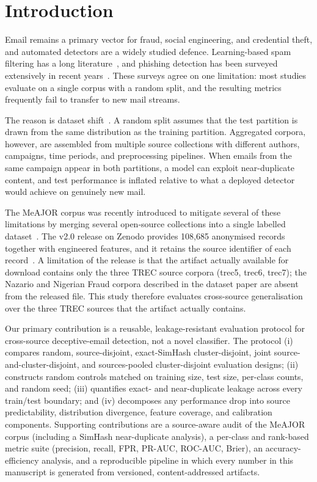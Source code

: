 \documentclass[conference]{IEEEtran}
\begin{document}
\section{Introduction}
Email remains a primary vector for fraud, social engineering, and credential theft, and automated detectors are a widely studied defence. Learning-based spam filtering has a long literature~\cite{blanzieri_bryl}, and phishing detection has been surveyed extensively in recent years~\cite{gupta_phishing}. These surveys agree on one limitation: most studies evaluate on a single corpus with a random split, and the resulting metrics frequently fail to transfer to new mail streams.

The reason is dataset shift~\cite{dataset_shift}. A random split assumes that the test partition is drawn from the same distribution as the training partition. Aggregated corpora, however, are assembled from multiple source collections with different authors, campaigns, time periods, and preprocessing pipelines. When emails from the same campaign appear in both partitions, a model can exploit near-duplicate content, and test performance is inflated relative to what a deployed detector would achieve on genuinely new mail.

The MeAJOR corpus was recently introduced to mitigate several of these limitations by merging several open-source collections into a single labelled dataset~\cite{meajor_dataset_paper}. The v2.0 release on Zenodo provides 108,685 anonymised records together with engineered features, and it retains the source identifier of each record~\cite{meajor_dataset_record}. A limitation of the release is that the artifact actually available for download contains only the three TREC source corpora (trec5, trec6, trec7); the Nazario and Nigerian Fraud corpora described in the dataset paper are absent from the released file. This study therefore evaluates cross-source generalisation over the three TREC sources that the artifact actually contains.

Our primary contribution is a reusable, leakage-resistant evaluation protocol for cross-source deceptive-email detection, not a novel classifier. The protocol (i) compares random, source-disjoint, exact-SimHash cluster-disjoint, joint source-and-cluster-disjoint, and sources-pooled cluster-disjoint evaluation designs; (ii) constructs random controls matched on training size, test size, per-class counts, and random seed; (iii) quantifies exact- and near-duplicate leakage across every train/test boundary; and (iv) decomposes any performance drop into source predictability, distribution divergence, feature coverage, and calibration components. Supporting contributions are a source-aware audit of the MeAJOR corpus (including a SimHash near-duplicate analysis), a per-class and rank-based metric suite (precision, recall, FPR, PR-AUC, ROC-AUC, Brier), an accuracy-efficiency analysis, and a reproducible pipeline in which every number in this manuscript is generated from versioned, content-addressed artifacts.
\end{document}
